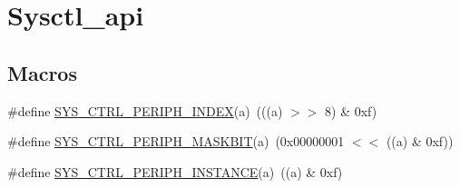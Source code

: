 \hypertarget{group__sysctl__api}{}\section{Sysctl\+\_\+api}
\label{group__sysctl__api}
\subsection*{Macros}
\begin{DoxyCompactItemize}
\item 
\#define \hyperlink{group__sysctl__api_gac3a62817ec1b58938c9d0d7c26751155}{S\+Y\+S\+\_\+\+C\+T\+R\+L\+\_\+\+P\+E\+R\+I\+P\+H\+\_\+\+I\+N\+D\+EX}(a)~(((a) $>$$>$ 8) \& 0xf)
\item 
\#define \hyperlink{group__sysctl__api_ga54a2e4365938932a4352737c25dfe7b9}{S\+Y\+S\+\_\+\+C\+T\+R\+L\+\_\+\+P\+E\+R\+I\+P\+H\+\_\+\+M\+A\+S\+K\+B\+IT}(a)~(0x00000001 $<$$<$ ((a) \& 0xf))
\item 
\#define \hyperlink{group__sysctl__api_ga286bcc220f1f43c150144e1ec405b28b}{S\+Y\+S\+\_\+\+C\+T\+R\+L\+\_\+\+P\+E\+R\+I\+P\+H\+\_\+\+I\+N\+S\+T\+A\+N\+CE}(a)~((a) \& 0xf)
\end{DoxyCompactItemize}
